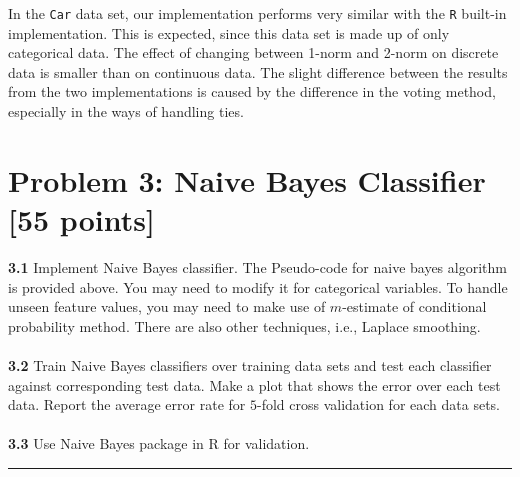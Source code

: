 \documentclass{article}
\newcommand{\code}[1]{\texttt{#1}}
\newcommand{\sep}{\begin{center}\textcolor{gray}{\rule{\textwidth}{0.75pt}}\end{center}}
\begin{document}
In the \code{Car} data set, our implementation performs very similar with the \code{R} built-in implementation. 
This is expected, since this data set is made up of only categorical data. 
The effect of changing between 1-norm and 2-norm on discrete data is smaller than on continuous data.
The slight difference between the results from the two implementations is caused by the difference in the voting method, especially in the ways of handling ties.










































%
\newpage
\section*{Problem 3: Naive Bayes Classifier [55 points]} 
	
\textbf{3.1} Implement Naive Bayes classifier. The Pseudo-code for naive bayes algorithm is provided above. You may need to modify it for categorical variables. To handle unseen feature values, you may need to make use of $m$-estimate of conditional probability method. There are also other techniques, i.e., Laplace smoothing.
\\
\\
\textbf{3.2} Train Naive Bayes classifiers over training data sets and test each classifier against corresponding test data. Make a plot that shows the error over each test data. Report the average error rate for $5$-fold cross validation for each data sets.
\\
\\
\textbf{3.3}  Use  Naive Bayes package in R for validation.
\sep 
\end{document}
